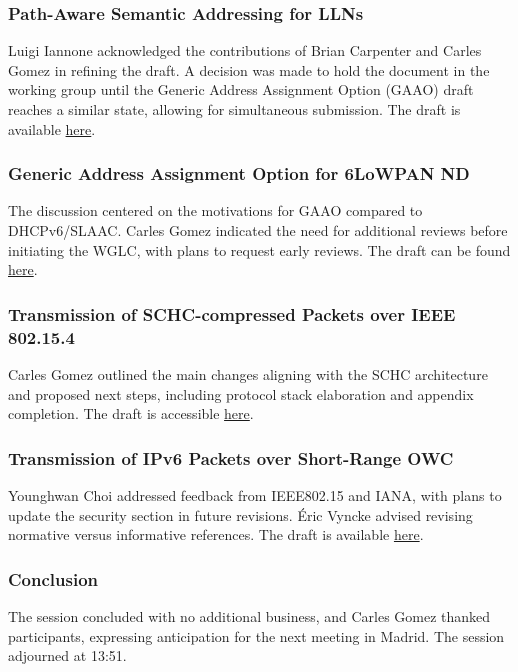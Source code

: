 \documentclass{article}
\begin{document}
\subsubsection{Path-Aware Semantic Addressing for LLNs}
Luigi Iannone acknowledged the contributions of Brian Carpenter and Carles Gomez in refining the draft. A decision was made to hold the document in the working group until the Generic Address Assignment Option (GAAO) draft reaches a similar state, allowing for simultaneous submission. The draft is available \href{https://datatracker.ietf.org/doc/html/draft-ietf-6lo-path-aware-semantic-addressing-11}{here}.

\subsubsection{Generic Address Assignment Option for 6LoWPAN ND}
The discussion centered on the motivations for GAAO compared to DHCPv6/SLAAC. Carles Gomez indicated the need for additional reviews before initiating the WGLC, with plans to request early reviews. The draft can be found \href{https://datatracker.ietf.org/doc/html/draft-ietf-6lo-nd-gaao-02}{here}.

\subsubsection{Transmission of SCHC-compressed Packets over IEEE 802.15.4}
Carles Gomez outlined the main changes aligning with the SCHC architecture and proposed next steps, including protocol stack elaboration and appendix completion. The draft is accessible \href{https://datatracker.ietf.org/doc/html/draft-ietf-6lo-schc-15dot4-09}{here}.

\subsubsection{Transmission of IPv6 Packets over Short-Range OWC}
Younghwan Choi addressed feedback from IEEE802.15 and IANA, with plans to update the security section in future revisions. Éric Vyncke advised revising normative versus informative references. The draft is available \href{https://datatracker.ietf.org/doc/html/draft-ietf-6lo-owc-03}{here}.

\subsubsection{Conclusion}
The session concluded with no additional business, and Carles Gomez thanked participants, expressing anticipation for the next meeting in Madrid. The session adjourned at 13:51.
\end{document}
